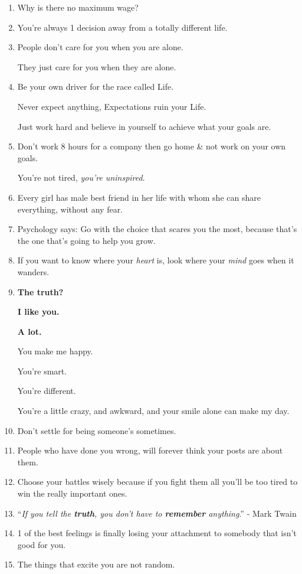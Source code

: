 \documentclass{article}
\numberwithin{equation}{section}
\begin{document}
\begin{enumerate}
    I can look you dead in the face while you're talking and not hear a damn thing you said.
    \item Why is there no maximum wage?
    \item You're always 1 decision away from a totally different life.
    \item People don't care for you when you are alone.
    
    They just care for you when they are alone.
    \item Be your own driver for the race called Life.
    
    Never expect anything, Expectations ruin your Life.
    
    Just work hard and believe in yourself to achieve what your goals are.
    \item Don't work 8 hours for a company then go home \& not work on your own goals.
    
    You're not tired, \textit{you're uninspired}.
    \item Every girl has male best friend in her life with whom she can share everything, without any fear.
    \item Psychology says: Go with the choice that scares you the most, because that's the one that's going to help you grow.
    \item If you want to know where your \textit{heart} is, look where your \textit{mind} goes when it wanders.
    \item \textbf{The truth?}
    
    \textbf{I like you.}
    
    \textbf{A lot.}
    
    You make me happy.
    
    You're smart.
    
    You're different.
    
    You're a little crazy, and awkward, and your smile alone can make my day.
    \item Don't settle for being someone's sometimes.
    \item People who have done you wrong, will forever think your posts are about them.
    \item Choose your battles wisely because if you fight them all you'll be too tired to win the really important ones.
    \item ``\textit{If you tell the \textbf{truth}, you don't have to \textbf{remember} anything}.'' - Mark Twain
    \item 1 of the best feelings is finally losing your attachment to somebody that isn't good for you.
    \item The things that excite you are not random.
    

\end{enumerate}
\end{document}

